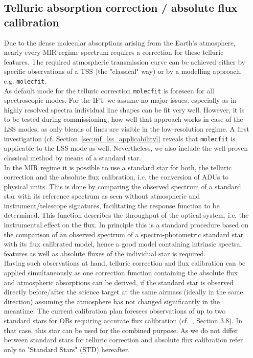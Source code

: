 
\subsection{Telluric absorption correction / absolute flux calibration}\label{ssec:tellcorr}
Due to the dense molecular absorptions arising from the Earth's atmosphere, nearly every \ac{MIR} regime spectrum requires a correction for these telluric features. The required atmospheric transmission curve can be achieved either by specific observations of a \ac{TSS} (the "classical" way) or by a modelling approach, e.g. \texttt{molecfit}.\\
As default mode for the telluric correction \texttt{molecfit} is foreseen for all spectroscopic modes. For the \ac{IFU} we assume no major issues, especially as in highly resolved spectra individual line shapes can be fit very well. However, it is to be tested during commissioning, how well that approach works in case of the \ac{LSS} modes, as only blends of lines are visible in the low-resolution regime. A first investigation (cf. Section~\ref{sec:mf_lss_applicability}) reveals that \texttt{molecfit} is applicable to the \ac{LSS} mode as well. Nevertheless, we also include the well-proven classical method by means of a standard star.\\
In the \ac{MIR} regime it is possible to use a standard star for both, the telluric correction and the absolute flux calibration, i.e. the conversion of \ac{ADU}s to physical units. This is done by comparing the observed spectrum of a standard star with its reference spectrum as seen without atmospheric and instrument/telescope signatures, facilitating the response function to be determined. This function describes the throughput of the optical system, i.e. the instrumental effect on the flux. In principle this is a standard procedure based on the comparison of an observed spectrum of a spectro-photometric standard star with its flux calibrated model, hence a good model containing intrinsic spectral features as well as absolute fluxes of the individual star is required.\\
Having such observations at hand, telluric correction and flux calibration can be applied simultaneously as one correction function containing the absolute flux and atmospheric absorptions can be derived, if the standard star is observed directly before/after the science target at the same airmass (ideally in the same direction) assuming the atmosphere has not changed significantly in the meantime. The current calibration plan foresees observations of up to two standard stars for \ac{OB}s requiring accurate flux calibration (cf.~\cite{METIS-calibration_plan}, Section 3.8). In that case, this star can be used for the combined purpose. As we do not differ between standard stars for telluric correction and absolute flux calibration refer only to "Standard Stars" (STD) hereafter.\\

